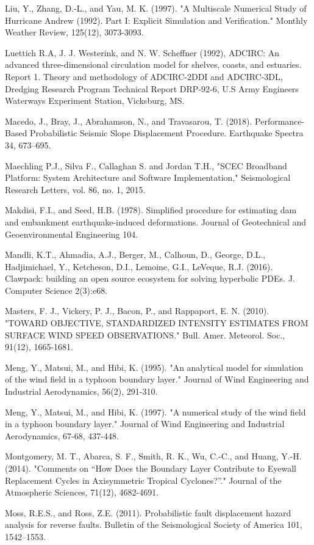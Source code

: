 Liu, Y., Zhang, D.-L., and Yau, M. K. (1997). "A Multiscale Numerical Study of Hurricane Andrew (1992). Part I: Explicit Simulation and Verification." Monthly Weather Review, 125(12), 3073-3093.

Luettich R.A, J. J. Westerink, and N. W. Scheffner (1992), ADCIRC: An advanced three-dimensional circulation model for shelves, coasts, and estuaries. Report 1. Theory and methodology of ADCIRC-2DDI and ADCIRC-3DL, Dredging Research Program Technical Report DRP-92-6, U.S Army Engineers Waterways Experiment Station, Vicksburg, MS.

Macedo, J., Bray, J., Abrahamson, N., and Travasarou, T. (2018). Performance-Based Probabilistic Seismic Slope Displacement Procedure. Earthquake Spectra 34, 673–695.

Maechling P.J., Silva F., Callaghan S. and Jordan T.H., "SCEC Broadband Platform: System Architecture and Software Implementation," Seismological Research Letters, vol. 86, no. 1, 2015.

Makdisi, F.I., and Seed, H.B. (1978). Simplified procedure for estimating dam and embankment earthquake-induced deformations. Journal of Geotechnical and Geoenvironmental Engineering 104.

Mandli, K.T., Ahmadia, A.J., Berger, M., Calhoun, D., George, D.L., Hadjimichael, Y., Ketcheson, D.I., Lemoine, G.I., LeVeque, R.J. (2016). Clawpack: building an open source ecosystem for solving hyperbolic PDEs. J. Computer Science 2(3):e68.

Masters, F. J., Vickery, P. J., Bacon, P., and Rappaport, E. N. (2010). "TOWARD OBJECTIVE, STANDARDIZED INTENSITY ESTIMATES FROM SURFACE WIND SPEED OBSERVATIONS." Bull. Amer. Meteorol. Soc., 91(12), 1665-1681.

Meng, Y., Matsui, M., and Hibi, K. (1995). "An analytical model for simulation of the wind field in a typhoon boundary layer." Journal of Wind Engineering and Industrial Aerodynamics, 56(2), 291-310.

Meng, Y., Matsui, M., and Hibi, K. (1997). "A numerical study of the wind field in a typhoon boundary layer." Journal of Wind Engineering and Industrial Aerodynamics, 67-68, 437-448.

Montgomery, M. T., Abarca, S. F., Smith, R. K., Wu, C.-C., and Huang, Y.-H. (2014). "Comments on “How Does the Boundary Layer Contribute to Eyewall Replacement Cycles in Axisymmetric Tropical Cyclones?”." Journal of the Atmospheric Sciences, 71(12), 4682-4691.

Moss, R.E.S., and Ross, Z.E. (2011). Probabilistic fault displacement hazard analysis for reverse faults. Bulletin of the Seismological Society of America 101, 1542–1553.

